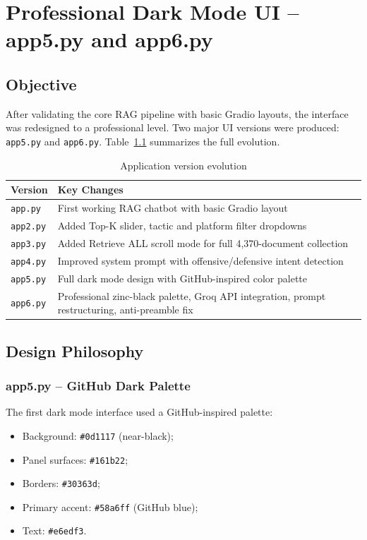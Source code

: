 \documentclass[12pt,a4paper]{report}
\begin{document}
\chapter{Professional Dark Mode UI -- app5.py and app6.py}

\section{Objective}

After validating the core RAG pipeline with basic Gradio layouts, the interface was redesigned to a professional level. Two major UI versions were produced: \texttt{app5.py} and \texttt{app6.py}. Table~\ref{tab:versions} summarizes the full evolution.

\begin{table}[H]
\centering
\begin{tabularx}{\textwidth}{lX}
\toprule
\textbf{Version} & \textbf{Key Changes} \\
\midrule
\texttt{app.py} & First working RAG chatbot with basic Gradio layout \\
\texttt{app2.py} & Added Top-K slider, tactic and platform filter dropdowns \\
\texttt{app3.py} & Added Retrieve ALL scroll mode for full 4,370-document collection \\
\texttt{app4.py} & Improved system prompt with offensive/defensive intent detection \\
\texttt{app5.py} & Full dark mode design with GitHub-inspired color palette \\
\texttt{app6.py} & Professional zinc-black palette, Groq API integration, prompt restructuring, anti-preamble fix \\
\bottomrule
\end{tabularx}
\caption{Application version evolution}
\label{tab:versions}
\end{table}

\section{Design Philosophy}

\subsection{app5.py -- GitHub Dark Palette}

The first dark mode interface used a GitHub-inspired palette:

\begin{itemize}
    \item Background: \texttt{\#0d1117} (near-black);
    \item Panel surfaces: \texttt{\#161b22};
    \item Borders: \texttt{\#30363d};
    \item Primary accent: \texttt{\#58a6ff} (GitHub blue);
    \item Text: \texttt{\#e6edf3}.
\end{itemize}
\end{document}
